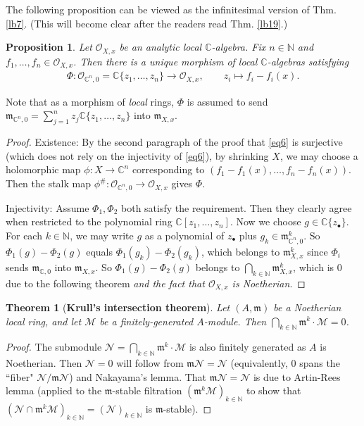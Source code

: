 \documentclass[12pt,b5paper,notitlepage]{report}
\theoremstyle{definition}
\theoremstyle{plain}
\newtheorem{thm}[df]{Theorem}
\newtheorem{pp}[df]{Proposition}
\newcommand{\fk}{\mathfrak}
\newcommand{\mc}{\mathcal}
\newcommand{\scr}{\mathscr}
\newcommand{\blt}{\bullet}
\newcommand{\Cbb}{\mathbb C}
\newcommand{\Nbb}{\mathbb N}
\numberwithin{equation}{section}
\begin{document}
The following proposition can be viewed as the infinitesimal version of Thm. \ref{lb7}. (This will become clear after the readers read Thm. \ref{lb19}.)

\begin{pp}\label{lb8}
Let $\scr O_{X,x}$ be an analytic local $\Cbb$-algebra. Fix $n\in\Nbb$ and $f_1,\dots,f_n\in\scr O_{X,x}$. Then there is a unique morphism of local $\Cbb$-algebras satisfying
\begin{align}
\Phi:\scr O_{\Cbb^n,0}=\Cbb\{z_1,\dots,z_n\}\rightarrow \scr O_{X,x},\qquad z_i\mapsto f_i-f_i(x).
\end{align}
\end{pp}

Note that as a morphism of \emph{local} rings, $\Phi$ is assumed to send $\fk m_{\Cbb^n,0}=\sum_{j=1}^n z_j\Cbb\{z_1,\dots,z_n\}$ into $\fk m_{X,x}$.



\begin{proof}
Existence: By the second paragraph of the proof that \eqref{eq6} is surjective (which does not rely on the injectivity of \eqref{eq6}), by shrinking $X$, we may choose a holomorphic map $\phi:X\rightarrow\Cbb^n$ corresponding to $(f_1-f_1(x),\dots,f_n-f_n(x))$. Then the stalk map $\phi^\#:\scr O_{\Cbb^n,0}\rightarrow\scr O_{X,x}$ gives $\Phi$.

Injectivity: Assume $\Phi_1,\Phi_2$ both satisfy the requirement. Then they clearly agree when restricted to the polynomial ring $\Cbb[z_1,\dots,z_n]$. Now we choose $g\in\Cbb\{z_\blt\}$. For each $k\in\Nbb$, we may write $g$ as a polynomial of $z_\blt$ plus $g_k\in\fk m_{\Cbb^n,0}^k$. So $\Phi_1(g)-\Phi_2(g)$ equals $\Phi_1(g_k)-\Phi_2(g_k)$, which belongs to $\fk m_{X,x}^k$ since  $\Phi_i$  sends $\fk m_{\Cbb,0}$ into $\fk m_{X,x}$. So $\Phi_1(g)-\Phi_2(g)$ belongs to $\bigcap_{k\in\Nbb}\fk m_{X,x}^k$, which is $0$ due to the following theorem \emph{and the fact that $\scr O_{X,x}$ is Noetherian}.
\end{proof}



\begin{thm}[\textbf{Krull's intersection theorem}]\label{lb162} 
Let $(A,\fk m)$ be a Noetherian local ring, and let $\mc M$ be a finitely-generated $A$-module. Then $\bigcap_{k\in\Nbb}\fk m^k\cdot \mc M=0$.
\end{thm}

\begin{proof}
The submodule $\mc N=\bigcap_{k\in\Nbb}\fk m^k\cdot \mc M$ is also finitely generated as $A$ is Noetherian. Then $\mc N=0$ will follow from $\fk m\mc N=\mc N$ (equivalently, $0$ spans the ``fiber" $\mc N/\fk m\mc N$) and  Nakayama's lemma. That  $\fk m\mc N=\mc N$ is due to Artin-Rees lemma (applied to the $\fk m$-stable filtration $(\fk m^k\mc M)_{k\in\Nbb}$ to show that $(\mc N\cap\fk m^k\mc M)_{k\in\Nbb}=(\mc N)_{k\in\Nbb}$ is $\fk m$-stable).
\end{proof}
\end{document}
